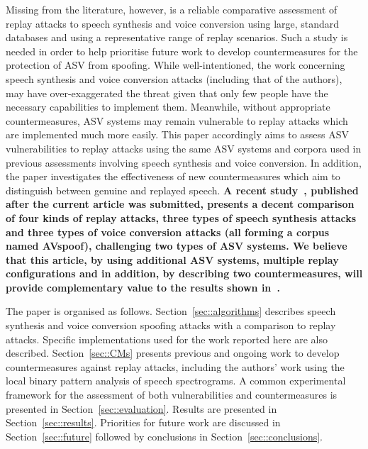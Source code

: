 
Missing from the literature, however, is a reliable comparative assessment 
of replay attacks to speech synthesis and voice conversion using large, 
standard databases and using a representative range of replay scenarios. 
Such a study is needed in order to help prioritise future work to develop
countermeasures for the protection of ASV from spoofing.
While well-intentioned, the work concerning speech synthesis and voice conversion attacks 
(including that of the authors), may have over-exaggerated the threat given that
only few people have the necessary capabilities to implement them.  Meanwhile, 
without appropriate countermeasures, ASV systems may remain vulnerable to replay 
attacks which are implemented much more easily. 
This paper accordingly aims to assess ASV vulnerabilities 
to replay attacks using the same ASV systems and corpora used in 
previous assessments involving speech synthesis and voice conversion.  In addition, the paper investigates the effectiveness of 
new countermeasures which aim to distinguish between genuine and replayed speech. {\bfseries A recent study~\cite{Ergunay2015}, published after the current article was submitted, presents a decent comparison of four kinds of replay attacks, three types of speech synthesis attacks and three types of voice conversion attacks (all forming a corpus named AVspoof), challenging two types of ASV systems. We believe that this article, by using additional ASV systems, multiple replay configurations and in addition, by describing two countermeasures, will provide complementary value to the results shown in~\cite{Ergunay2015}. } 

The paper is organised as follows.  Section~\ref{sec::algorithms} describes speech synthesis and voice conversion spoofing attacks with a comparison to replay attacks. Specific implementations used for the work reported here are also described. Section~\ref{sec::CMs} presents previous and ongoing work to develop countermeasures against replay attacks, including the authors' work using the local binary pattern analysis of speech spectrograms.  A common experimental framework for the assessment of both vulnerabilities and countermeasures is presented in Section~\ref{sec::evaluation}. Results are presented in Section~\ref{sec::results}.  Priorities for future work are discussed in Section~\ref{sec::future} followed by conclusions in Section~\ref{sec::conclusions}.
